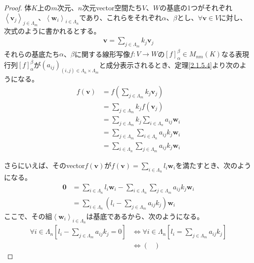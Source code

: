 \documentclass[dvipdfmx]{jsarticle}
\begin{document}
\begin{proof}
体$K$上の$m$次元、$n$次元vector空間たち$V$、$W$の基底の1つがそれぞれ$\left\langle \mathbf{v}_{j} \right\rangle_{j \in \varLambda_{m}}$、$\left\langle \mathbf{w}_{i} \right\rangle_{i \in \varLambda_{n}}$であり、これらをそれぞれ$\alpha$、$\beta$とし、$\forall\mathbf{v} \in V$に対し、次式のように書かれるとする。
\begin{align*}
\mathbf{v} = \sum_{j \in \varLambda_{m}} {k_{j}\mathbf{v}_{j}}
\end{align*}
それらの基底たち$\alpha$、$\beta$に関する線形写像$f:V \rightarrow W$の$[ f]^{\beta}_{\alpha} \in M_{nm}(K)$なる表現行列$[ f]^{\beta}_{\alpha}$が$\left( a_{ij} \right)_{(i,j) \in \varLambda_{n} \times \varLambda_{m}}$と成分表示されるとき、定理\ref{2.1.5.4}より次のようになる。
\begin{align*}
f\left( \mathbf{v} \right) &= f\left( \sum_{j \in \varLambda_{m}} {k_{j}\mathbf{v}_{j}} \right)\\
&= \sum_{j \in \varLambda_{m}} {k_{j}f\left( \mathbf{v}_{j} \right)}\\
&= \sum_{j \in \varLambda_{m}} {k_{j}\sum_{i \in \varLambda_{n}} {a_{ij}\mathbf{w}_{i}}}\\
&= \sum_{j \in \varLambda_{m}} {\sum_{i \in \varLambda_{n}} {a_{ij}k_{j}\mathbf{w}_{i}}}\\
&= \sum_{i \in \varLambda_{n}} {\sum_{j \in \varLambda_{m}} {a_{ij}k_{j}}\mathbf{w}_{i}}
\end{align*}\par
さらにいえば、そのvector$f\left( \mathbf{v} \right)$が$f\left( \mathbf{v} \right) = \sum_{i \in \varLambda_{n}} {l_{i}\mathbf{w}_{i}}$を満たすとき、次のようになる。
\begin{align*}
\mathbf{0} &= \sum_{i \in \varLambda_{n}} {l_{i}\mathbf{w}_{i}} - \sum_{i \in \varLambda_{n}} {\sum_{j \in \varLambda_{m}} {a_{ij}k_{j}}\mathbf{w}_{i}}\\
&= \sum_{i \in \varLambda_{n}} {\left( l_{i} - \sum_{j \in \varLambda_{m}} {a_{ij}k_{j}} \right)\mathbf{w}_{i}}
\end{align*}
ここで、その組$\left\langle \mathbf{w}_{i} \right\rangle_{i \in \varLambda_{n}}$は基底であるから、次のようになる。
\begin{align*}
\forall i \in \varLambda_{n}\left[ l_{i} - \sum_{j \in \varLambda_{m}} {a_{ij}k_{j}} = 0 \right] &\Leftrightarrow \forall i \in \varLambda_{n}\left[ l_{i} = \sum_{j \in \varLambda_{m}} {a_{ij}k_{j}} \right]\\
&\Leftrightarrow \begin{pmatrix}

\end{pmatrix}
\end{align*}
\end{proof}
\end{document}
